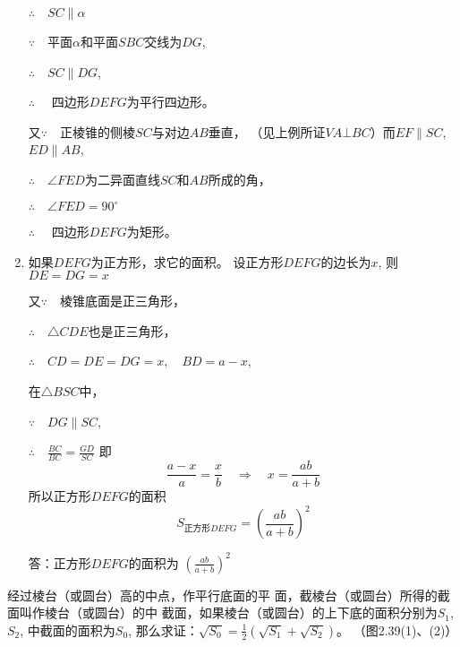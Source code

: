 \begin{solution}
\begin{enumerate}
$\therefore\quad SC\parallel \alpha$

$\because\quad $平面$\alpha$和平面$SBC$交线为$DG$,

$\therefore\quad SC\parallel DG$,

$\therefore\quad$ 四边形$DEFG$为平行四边形。

又$\because\quad $正棱锥的侧棱$SC$与对边$AB$垂直，
（见上例所证$VA\bot BC$）而$EF\parallel SC$, $ED\parallel AB$,

$\therefore\quad \angle FED$为二异面直线$SC$和$AB$所成的角，

$\therefore\quad \angle FED=90^{\circ}$

$\therefore\quad $ 四边形$DEFG$为矩形。

\item 如果$DEFG$为正方形，求它的面积。
设正方形$DEFG$的边长为$x$, 则
$DE=DG=x$

又$\because\quad $棱锥底面是正三角形，

$\therefore\quad \triangle  CDE$也是正三角形，

$\therefore\quad CD=DE=DG=x,\quad BD=a-x$,

在$\triangle BSC$中，

$\because\quad DG\parallel SC$,

$\therefore\quad \frac{BC}{BC}=\frac{GD}{SC}$
即
\[\frac{a-x}{a}=\frac{x}{b}\quad \Rightarrow\quad x=\frac{ab}{a+b}\]
所以正方形$DEFG$的面积
\[S_{\text{正方形}DEFG}=\left(\frac{ab}{a+b}\right)^2\]

答：正方形$DEFG$的面积为
$\left(\frac{ab}{a+b}\right)^2$
\end{enumerate}
\end{solution}

\begin{example}
    经过棱台（或圆台）高的中点，作平行底面的平
面，截棱台（或圆台）所得的截面叫作棱台（或圆台）的中
截面，如果棱台（或圆台）的上下底的面积分别为$S_1$, $S_2$,
中截面的面积为$S_0$, 那么求证：$\sqrt{S_0}=\frac{1}{2}\left(\sqrt{S_1}+\sqrt{S_2}\right)$。
（图2.39(1)、(2)）
\end{example}

